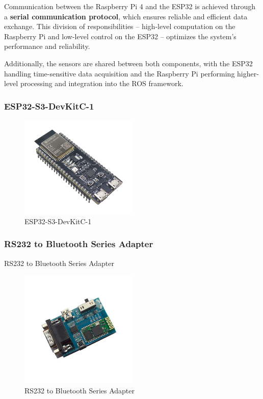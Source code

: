 \documentclass[../../main]{subfiles}
\begin{document}
Communication between the Raspberry Pi 4 and the ESP32 is achieved 
through a \textbf{serial communication protocol}, which ensures 
reliable and efficient data exchange. This division of responsibilities 
-- high-level computation on the Raspberry Pi and low-level control 
on the ESP32 -- optimizes the system's performance and reliability.

Additionally, the sensors are shared between both components, with 
the ESP32 handling time-sensitive data acquisition and the Raspberry 
Pi performing higher-level processing and integration into the ROS 
framework.

\subsubsection{ESP32-S3-DevKitC-1}

\begin{figure}[H]
    \centering
    \includegraphics[width=0.5\textwidth]{fig/esp32.png}
    \caption{ ESP32-S3-DevKitC-1}
    \label{ESP32-S3-DevKitC-1} %
\end{figure}

\subsubsection{RS232 to Bluetooth Series Adapter}
RS232 to Bluetooth Series Adapter
\begin{figure}[H]
    \centering
    \includegraphics[width=0.5\textwidth]{fig/bluetooth.jpg}
    \caption{ RS232 to Bluetooth Series Adapter}
    \label{RS232 to Bluetooth Series Adapter} %
\end{figure}
\end{document}
